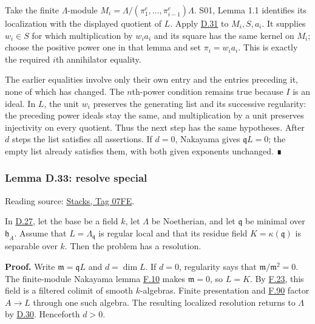 \documentclass[11pt,a4paper,openany]{report}
\newcounter{none}
\begin{document}
Take the finite \(\Lambda\)-module \(M_i=\Lambda/(\pi_1^e,\ldots,\pi_{i-1}^e)\Lambda\). S01, Lemma 1.1 identifies its localization with the displayed quotient of \(L\). Apply \hyperref[AG-RG-S05-smoothing-lemma-ogoma]{D.31} to \(M_i,S,a_i\). It supplies \(w_i\in S\) for which multiplication by \(w_i a_i\) and its square has the same kernel on \(M_i\); choose the positive power one in that lemma and set \(\pi_i=w_i a_i\). This is exactly the required \(i\)th annihilator equality.

The earlier equalities involve only their own entry and the entries preceding it, none of which has changed. The \(n\)th-power condition remains true because \(I\) is an ideal. In \(L\), the unit \(w_i\) preserves the generating list and its successive regularity: the preceding power ideals stay the same, and multiplication by a unit preserves injectivity on every quotient. Thus the next step has the same hypotheses. After \(d\) steps the list satisfies all assertions. If \(d=0\), Nakayama gives \(\mathfrak qL=0\); the empty list already satisfies them, with both given exponents unchanged. ∎

\label{AG-RG-S05-smoothing-lemma-resolve-special}

\subsubsection{Lemma D.33: resolve special}\label{AG-RG-S05-lemma-d.33-resolve-special}

Reading source: \href{https://stacks.math.columbia.edu/tag/07FE}{Stacks, Tag 07FE}.

In \hyperref[AG-RG-S05-smoothing-situation-local]{D.27}, let the base be a field \(k\), let \(\Lambda\) be Noetherian, and let \(\mathfrak q\) be minimal over \(\mathfrak h_A\). Assume that \(L=\Lambda_{\mathfrak q}\) is regular local and that its residue field \(K=\kappa(\mathfrak q)\) is separable over \(k\). Then the problem has a resolution.

\textbf{Proof.} Write \(\mathfrak m=\mathfrak qL\) and \(d=\dim L\). If \(d=0\), regularity says that \(\mathfrak m/\mathfrak m^2=0\). The finite-module Nakayama lemma \hyperref[AG-RG-S05-algebra-lemma-NAK]{F.10} makes \(\mathfrak m=0\), so \(L=K\). By \hyperref[AG-RG-S05-algebra-lemma-colimit-syntomic]{F.23}, this field is a filtered colimit of smooth \(k\)-algebras. Finite presentation and \hyperref[AG-RG-S05-algebra-lemma-when-colimit]{F.90} factor \(A\to L\) through one such algebra. The resulting localized resolution returns to \(\Lambda\) by \hyperref[AG-RG-S05-smoothing-lemma-delocalize-height-zero]{D.30}. Henceforth \(d>0\).
\end{document}
